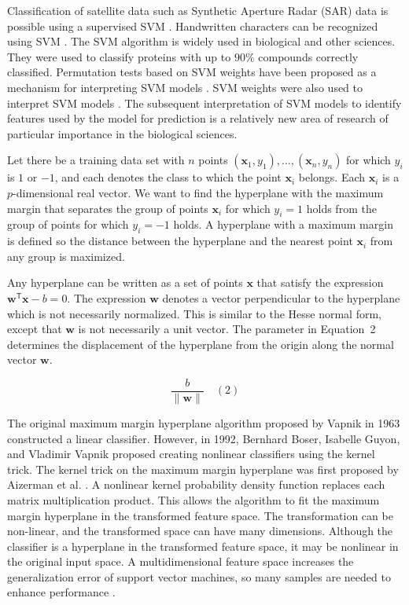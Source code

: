 \documentclass[preprint,12pt]{elsarticle}
\begin{document}
Classification of satellite data such as Synthetic Aperture Radar (SAR) data is possible using a supervised SVM \cite{Maity2016}. Handwritten characters can be recognized using SVM \cite{Decoste2002, Maitra2015}. The SVM algorithm is widely used in biological and other sciences. They were used to classify proteins with up to $90\%$ compounds correctly classified. Permutation tests based on SVM weights have been proposed as a mechanism for interpreting SVM models \cite{Gaonkar2013, Cuingnet2011}. SVM weights were also used to interpret SVM models \cite{Statnikov2006}. The subsequent interpretation of SVM models to identify features used by the model for prediction is a relatively new area of research of particular importance in the biological sciences.

Let there be a training data set with $n$ points $(\mathbf{x}_{1},y_{1}),\ldots,(\mathbf{x}_{n},y_{n})$ for which $y_{i}$ is $1$ or $-1$, and each denotes the class to which the point $\mathbf{x}_{i}$ belongs. Each $\mathbf{x}_{i}$ is a $p$-dimensional real vector. We want to find the hyperplane with the maximum margin that separates the group of points $\mathbf{x}_{i}$ for which $y_{i}=1$ holds from the group of points for which $y_{i}=-1$ holds. A hyperplane with a maximum margin is defined so the distance between the hyperplane and the nearest point $\mathbf{x}_{i}$ from any group is maximized.

Any hyperplane can be written as a set of points $\mathbf{x}$ that satisfy the expression $\mathbf{w}^{\mathsf{T}}\mathbf{x} -b=0$. The expression $\mathbf{w}$ denotes a vector perpendicular to the hyperplane which is not necessarily normalized. This is similar to the Hesse normal form, except that $\mathbf{w}$ is not necessarily a unit vector. The parameter in Equation~2 determines the displacement of the hyperplane from the origin along the normal vector $\mathbf{w}$.

\begin{equation}
	\frac{b}{\|\mathbf{w} \|}
	\quad\left(2\right)
\end{equation}

The original maximum margin hyperplane algorithm proposed by Vapnik in 1963 constructed a linear classifier. However, in 1992, Bernhard Boser, Isabelle Guyon, and Vladimir Vapnik proposed creating nonlinear classifiers using the kernel trick. The kernel trick on the maximum margin hyperplane \cite{Boser1992} was first proposed by Aizerman et al. \cite{Aizerman1964}. A nonlinear kernel probability density function replaces each matrix multiplication product. This allows the algorithm to fit the maximum margin hyperplane in the transformed feature space. The transformation can be non-linear, and the transformed space can have many dimensions. Although the classifier is a hyperplane in the transformed feature space, it may be nonlinear in the original input space. A multidimensional feature space increases the generalization error of support vector machines, so many samples are needed to enhance performance \cite{Jin2012}. 
\end{document}
